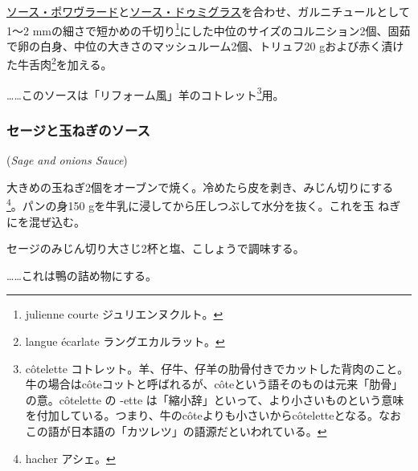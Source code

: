 \begin{recette}
\protect\hyperlink{sauce-poivrade}{ソース・ポワヴラード}と\protect\hyperlink{sauce-demi-glace}{ソース・ドゥミグラス}を合わせ、ガルニチュールとして1〜2
mmの細さで短かめの千切り\footnote{julienne courte ジュリエンヌクルト。}にした中位のサイズのコルニション2個、固茹で卵の白身、中位の大きさのマッシュルーム2個、トリュフ20
gおよび赤く漬けた牛舌肉\footnote{langue écarlate ラングエカルラット。}を加える。

\ldots{}\ldots{}このソースは「リフォーム風」羊のコトレット\footnote{côtelette
  コトレット。羊、仔牛、仔羊の肋骨付きでカットした背肉のこと。牛の場合はcôteコットと呼ばれるが、côteという語そのものは元来「肋骨」の意。côtelette
  の -ette
  は「縮小辞」といって、より小さいものという意味を付加している。つまり、牛のcôteよりも小さいからcôteletteとなる。なおこの語が日本語の「カツレツ」の語源だといわれている。}用。

\maeaki

\hypertarget{sage-and-onions-sauce}{%
\subsubsection{セージと玉ねぎのソース}\label{sage-and-onions-sauce}}

\hspace{1em}(\emph{Sage and onions Sauce})


大きめの玉ねぎ2個をオーブンで焼く。冷めたら皮を剥き、みじん切りにする
\footnote{hacher アシェ。}。パンの身150
gを牛乳に浸してから圧しつぶして水分を抜く。これを玉 ねぎにを混ぜ込む。

セージのみじん切り大さじ2杯と塩、こしょうで調味する。

\ldots{}\ldots{}これは鴨の詰め物にする。


\end{recette}
